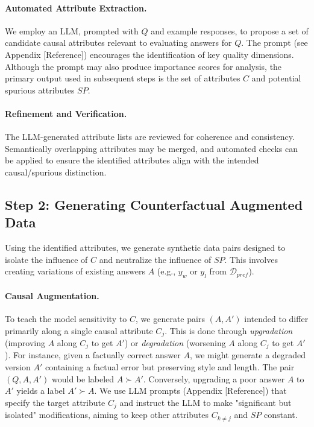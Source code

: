 \paragraph{Automated Attribute Extraction.} We employ an LLM, prompted with $Q$ and example responses, to propose a set of candidate causal attributes relevant to evaluating answers for $Q$. The prompt (see Appendix [Reference]) encourages the identification of key quality dimensions. Although the prompt may also produce importance scores for analysis, the primary output used in subsequent steps is the set of attributes $C$ and potential spurious attributes $SP$.

\paragraph{Refinement and Verification.} The LLM-generated attribute lists are reviewed for coherence and consistency. Semantically overlapping attributes may be merged, and automated checks can be applied to ensure the identified attributes align with the intended causal/spurious distinction.

\subsection{Step 2: Generating Counterfactual Augmented Data}
\label{subsec:counterfactual_generation}

Using the identified attributes, we generate synthetic data pairs designed to isolate the influence of $C$ and neutralize the influence of $SP$. This involves creating variations of existing answers $A$ (e.g., $y_w$ or $y_l$ from $\mathcal{D}_{pref}$).

\paragraph{Causal Augmentation.} To teach the model sensitivity to $C$, we generate pairs $(A, A')$ intended to differ primarily along a single causal attribute $C_j$. This is done through \emph{upgradation} (improving $A$ along $C_j$ to get $A'$) or \emph{degradation} (worsening $A$ along $C_j$ to get $A'$). For instance, given a factually correct answer $A$, we might generate a degraded version $A'$ containing a factual error but preserving style and length. The pair $(Q, A, A')$ would be labeled $A \succ A'$. Conversely, upgrading a poor answer $A$ to $A'$ yields a label $A' \succ A$. We use LLM prompts (Appendix [Reference]) that specify the target attribute $C_j$ and instruct the LLM to make "significant but isolated" modifications, aiming to keep other attributes $C_{k \neq j}$ and $SP$ constant.

